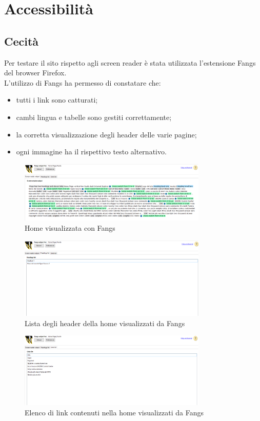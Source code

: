 \section{Accessibilità}

\subsection{Cecità}
Per testare il sito rispetto agli screen reader è stata utilizzata l'estensione Fangs del browser Firefox.\\
L'utilizzo di Fangs ha permesso di constatare che:
\begin{itemize}
	\item tutti i link sono catturati;
	\item cambi lingua e tabelle sono gestiti correttamente;
	\item la corretta visualizzazione degli header delle varie pagine;
	\item ogni immagine ha il rispettivo testo alternativo.
\end{itemize} 

\begin{figure}[H]
  \centering \includegraphics[width=0.8\textwidth]{images/fangs.png}
  \caption{Home visualizzata con Fangs}
\end{figure}

\begin{figure}[H]
  \centering \includegraphics[width=0.8\textwidth]{images/fangsHeader.png}
  \caption{Lista degli header della home visualizzati da Fangs}
\end{figure}
	
\begin{figure}[H]
  \centering \includegraphics[width=0.8\textwidth]{images/fangsLink.png}
  \caption{Elenco di link contenuti nella home visualizzati da Fangs}
\end{figure}

